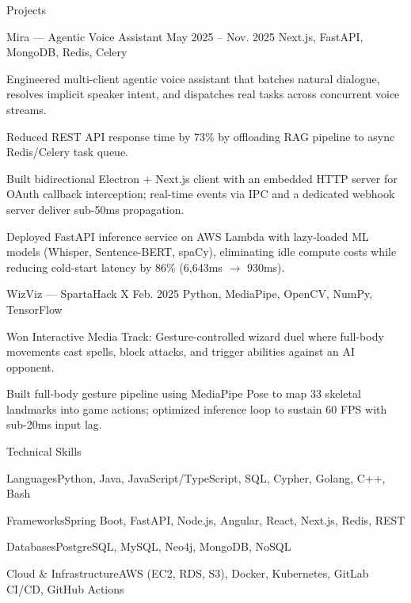 \documentclass[
	11pt
]{../../../resume}
\begin{document}
	\begin{rSection}{P}{rojects}
		\begin{rSectionEntry}
			{Mira --- Agentic Voice Assistant}
			{May 2025 -- Nov. 2025}
			{}
			{Next.js, FastAPI, MongoDB, Redis, Celery}
			{}

			\item Engineered multi-client agentic voice assistant that batches natural dialogue, resolves implicit speaker intent, and dispatches real tasks across concurrent voice streams.
			\item Reduced REST API response time by 73\% by offloading RAG pipeline to async Redis/Celery task queue.
			\item Built bidirectional Electron + Next.js client with an embedded HTTP server for OAuth callback interception; real-time events via IPC and a dedicated webhook server deliver sub-50ms propagation.
			\item Deployed FastAPI inference service on AWS Lambda with lazy-loaded ML models (Whisper, Sentence-BERT, spaCy), eliminating idle compute costs while reducing cold-start latency by 86\% (6{,}643ms $\rightarrow$ 930ms).
		\end{rSectionEntry}

		\begin{rSectionEntry}
			{WizViz --- SpartaHack X}
			{Feb. 2025}
			{}
			{Python, MediaPipe, OpenCV, NumPy, TensorFlow}
			{}

			\item Won Interactive Media Track: Gesture-controlled wizard duel where full-body movements cast spells, block attacks, and trigger abilities against an AI opponent.
			\item Built full-body gesture pipeline using MediaPipe Pose to map 33 skeletal landmarks into game actions; optimized inference loop to sustain 60 FPS with sub-20ms input lag.
		\end{rSectionEntry}
	\end{rSection}

	\begin{rSection}{T}{echnical Skills}
		\begin{rSet}{Languages}{Python, Java, JavaScript/TypeScript, SQL, Cypher, Golang, C++, Bash}
		\end{rSet}
		\begin{rSet}{Frameworks}{Spring Boot, FastAPI, Node.js, Angular, React, Next.js, Redis, REST}
		\end{rSet}
		\begin{rSet}{Databases}{PostgreSQL, MySQL, Neo4j, MongoDB, NoSQL}
		\end{rSet}
		\begin{rSet}{Cloud \& Infrastructure}{AWS (EC2, RDS, S3), Docker, Kubernetes, GitLab CI/CD, GitHub Actions}
		\end{rSet}
	\end{rSection}
\end{document}

